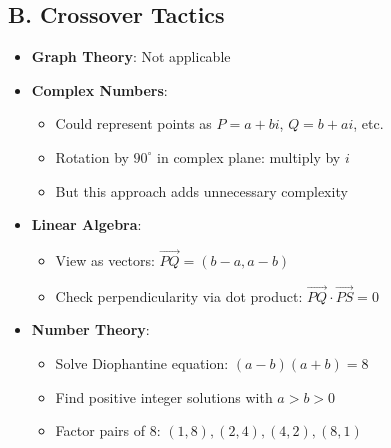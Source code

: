 \documentclass[]{article}
\begin{document}
\begin{tacticalbox}
\subsection*{B. Crossover Tactics}
\begin{itemize}[leftmargin=*]
    \item \textbf{Graph Theory}: Not applicable
    
    \item \textbf{Complex Numbers}: 
    \begin{itemize}
        \item Could represent points as $P = a + bi$, $Q = b + ai$, etc.
        \item Rotation by $90^\circ$ in complex plane: multiply by $i$
        \item But this approach adds unnecessary complexity
    \end{itemize}
    
    \item \textbf{Linear Algebra}:
    \begin{itemize}
        \item View as vectors: $\vec{PQ} = (b-a, a-b)$
        \item Check perpendicularity via dot product: $\vec{PQ} \cdot \vec{PS} = 0$
    \end{itemize}
    
    \item \textbf{Number Theory}:
    \begin{itemize}
        \item Solve Diophantine equation: $(a-b)(a+b) = 8$
        \item Find positive integer solutions with $a > b > 0$
        \item Factor pairs of 8: $(1,8), (2,4), (4,2), (8,1)$
    \end{itemize}
\end{itemize}
\end{tacticalbox}
\end{document}
